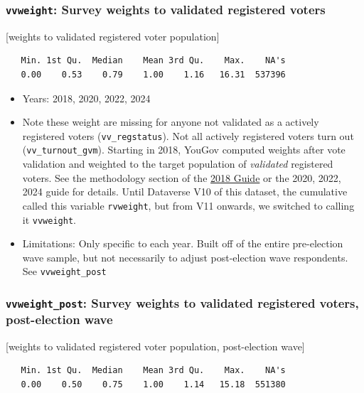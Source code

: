 \documentclass[10pt,article,oneside]{memoir}
\begin{document}
\subsubsection{\texorpdfstring{\texttt{vvweight}: Survey weights to
validated registered
voters}{vvweight: Survey weights to validated registered voters}}\label{vvweight-survey-weights-to-validated-registered-voters}

{[}weights to validated registered voter population{]}

\begin{verbatim}
   Min. 1st Qu.  Median    Mean 3rd Qu.    Max.    NA's 
   0.00    0.53    0.79    1.00    1.16   16.31  537396 
\end{verbatim}

\begin{itemize}
\tightlist
\item
  Years: 2018, 2020, 2022, 2024
\item
  Note these weight are missing for anyone not validated as a actively
  registered voters (\texttt{vv\_regstatus}). Not all actively
  registered voters turn out (\texttt{vv\_turnout\_gvm}). Starting in
  2018, YouGov computed weights after vote validation and weighted to
  the target population of \emph{validated} registered voters. See the
  methodology section of the
  \href{https://doi.org/10.7910/DVN/ZSBZ7K}{2018 Guide} or the 2020,
  2022, 2024 guide for details. Until Dataverse V10 of this dataset, the
  cumulative called this variable \texttt{rvweight}, but from V11
  onwards, we switched to calling it \texttt{vvweight}.
\item
  Limitations: Only specific to each year. Built off of the entire
  pre-election wave sample, but not necessarily to adjust post-election
  wave respondents. See \texttt{vvweight\_post}
\end{itemize}

\subsubsection{\texorpdfstring{\texttt{vvweight\_post}: Survey weights
to validated registered voters, post-election
wave}{vvweight\_post: Survey weights to validated registered voters, post-election wave}}\label{vvweight_post-survey-weights-to-validated-registered-voters-post-election-wave}

{[}weights to validated registered voter population, post-election
wave{]}

\begin{verbatim}
   Min. 1st Qu.  Median    Mean 3rd Qu.    Max.    NA's 
   0.00    0.50    0.75    1.00    1.14   15.18  551380 
\end{verbatim}
\end{document}
